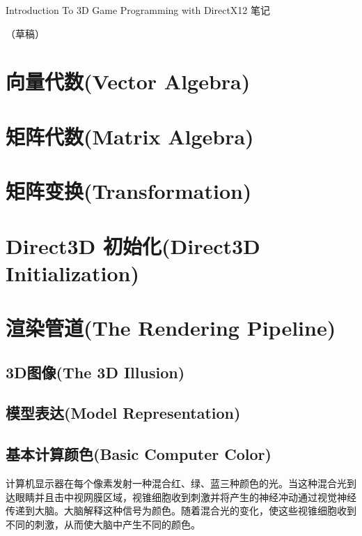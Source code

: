 \documentclass[11pt,a4paper,oldfontcommands]{memoir}
\begin{document}
\thispagestyle{empty}
{
\sffamily
\centering
{\LARGE
Introduction To 3D Game Programming with DirectX12 笔记
}

\vspace{3.5cm}
（草稿）
\clearpage
\tableofcontents*
\clearpage
\chapter{向量代数(Vector Algebra)}
\chapter{矩阵代数(Matrix Algebra)}
\chapter{矩阵变换(Transformation)}
\chapter{Direct3D 初始化(Direct3D Initialization)}

\chapter{渲染管道(The Rendering Pipeline)}
\section{3D图像(The 3D Illusion)}
\section{模型表达(Model Representation)}
\section{基本计算颜色(Basic Computer Color)}
\begin{flushleft}
计算机显示器在每个像素发射一种混合红、绿、蓝三种颜色的光。当这种混合光到达眼睛并且击中视网膜区域，视锥细胞收到刺激并将产生的神经冲动通过视觉神经传递到大脑。大脑解释这种信号为颜色。随着混合光的变化，使这些视锥细胞收到不同的刺激，从而使大脑中产生不同的颜色。
\end{flushleft}

}
\end{document}
